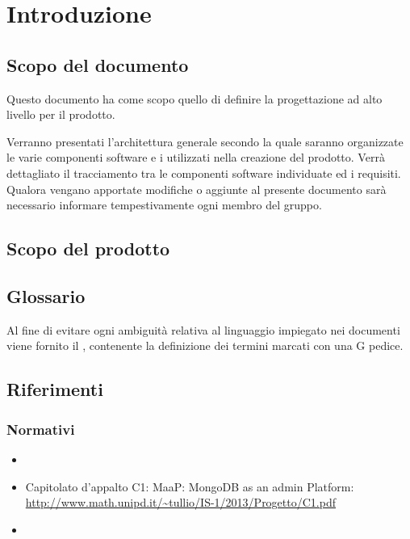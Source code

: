 \section{Introduzione}

\subsection{Scopo del documento}

Questo documento ha come scopo quello di definire la progettazione ad alto livello per il prodotto.

Verranno presentati l'architettura generale secondo la quale saranno organizzate le varie componenti software e i  utilizzati nella creazione del prodotto.
Verrà dettagliato il tracciamento tra le componenti software individuate ed i requisiti.
Qualora vengano apportate modifiche o aggiunte al presente documento sarà necessario informare tempestivamente ogni membro del gruppo.

\subsection{Scopo del prodotto}

\ScopoDelProdotto{}

\subsection{Glossario}

Al fine di evitare ogni ambiguità relativa al linguaggio impiegato nei documenti viene fornito il \Glossario{}, contenente la definizione dei termini marcati con una G pedice.

\subsection{Riferimenti}
	\label{Riferimenti}
	
		\subsubsection{Normativi}
		
		\begin{itemize}
		\item \NormeDiProgetto{}
		\item Capitolato d'appalto C1: MaaP: MongoDB as an admin Platform:\\
			\url{http://www.math.unipd.it/~tullio/IS-1/2013/Progetto/C1.pdf}
		\item \AnalisiDeiRequisiti{}  \\	
        \end{itemize}
        
